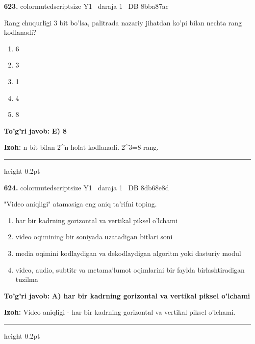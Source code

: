 \documentclass[10pt,a4paper,oneside]{article}
\begin{document}
\noindent\textbf{\color{ink}623.}  {color{muted}scriptsize Y1 \textbullet\ daraja 1 \textbullet\ DB 8bba87ac}
\par
Rang chuqurligi 3 bit bo'lsa, palitrada nazariy jihatdan ko'pi bilan nechta rang kodlanadi?
\begin{enumerate}[label=\Alph*),leftmargin=9mm]
\item 6
\item 3
\item 1
\item 4
\item 8
\end{enumerate}
\begin{tcolorbox}[enhanced,breakable,colback=teal!4,colframe=teal!50!black,boxrule=0.5pt,arc=1.1mm,left=3mm,right=3mm,top=1.7mm,bottom=1.7mm,before skip=2mm,after skip=2mm]
\textbf{\color{teal}To'g'ri javob:} \textbf{E) 8}
\par\smallskip
\textbf{Izoh:} n bit bilan 2\textasciicircum{}n holat kodlanadi. 2\textasciicircum{}3=8 rang.
\end{tcolorbox}
\vspace{2mm}\hrule height 0.2pt \vspace{3mm}

\noindent\textbf{\color{ink}624.}  {color{muted}scriptsize Y1 \textbullet\ daraja 1 \textbullet\ DB 8db68e8d}
\par
"Video aniqligi" atamasiga eng aniq ta'rifni toping.
\begin{enumerate}[label=\Alph*),leftmargin=9mm]
\item har bir kadrning gorizontal va vertikal piksel o'lchami
\item video oqimining bir soniyada uzatadigan bitlari soni
\item media oqimini kodlaydigan va dekodlaydigan algoritm yoki dasturiy modul
\item video, audio, subtitr va metama'lumot oqimlarini bir faylda birlashtiradigan tuzilma
\end{enumerate}
\begin{tcolorbox}[enhanced,breakable,colback=teal!4,colframe=teal!50!black,boxrule=0.5pt,arc=1.1mm,left=3mm,right=3mm,top=1.7mm,bottom=1.7mm,before skip=2mm,after skip=2mm]
\textbf{\color{teal}To'g'ri javob:} \textbf{A) har bir kadrning gorizontal va vertikal piksel o'lchami}
\par\smallskip
\textbf{Izoh:} Video aniqligi - har bir kadrning gorizontal va vertikal piksel o'lchami.
\end{tcolorbox}
\vspace{2mm}\hrule height 0.2pt \vspace{3mm}
\end{document}
